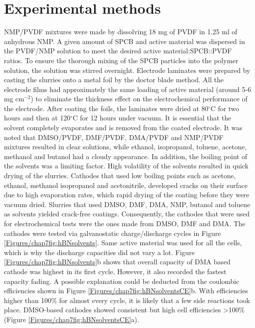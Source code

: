 \section{Experimental methods}
NMP/PVDF mixtures were made by dissolving 18 mg of PVDF in 1.25 ml of anhydrous NMP. A given amount of SPCB and active material was dispersed in the PVDF/NMP solution to meet the desired active material:SPCB::PVDF ratios. To ensure the thorough mixing of the SPCB particles into the polymer solution, the solution was stirred overnight. Electrode laminates were prepared by casting the slurries onto a metal foil by the doctor blade method. All the electrode films had approximately the same loading of active material (around 5-6 mg cm$^{-2}$) to eliminate the thickness effect on the electrochemical performance of the electrode. After coating the foils, the laminates were dried at 80$^{\circ}$C for two hours and then at 120$^{\circ}$C for 12 hours under vacuum. It is essential that the solvent completely evaporates and is removed from the coated electrode. It was noted that DMSO/PVDF, DMF/PVDF, DMA/PVDF and NMP/PVDF mixtures resulted in clear solutions, while ethanol, isopropanol, toluene, acetone, methanol and butanol had a cloudy appearance. 
In addition, the boiling point of the solvents was a limiting factor. High volatility of the solvents resulted in quick drying of the slurries. Cathodes that used low boiling points such as acetone, ethanol, methanol isopropanol and acetonitrile, developed cracks on their surface due to high evaporation rates, which rapid drying of the coating before they were vacuum dried.
Slurries that used DMSO, DMF, DMA, NMP, butanol and toluene as solvents yielded crack-free coatings. Consequently, the cathodes that were used for electrochemical tests were the ones made from DMSO, DMF and DMA.
The cathodes were tested via galvanostatic charge/discharge cycles in Figure \ref{Figures/chap7fig:hBNsolvents}. Same active material was used for all the cells, which is why the discharge capacities did not vary a lot. Figure \ref{Figures/chap7fig:hBNsolvents}b  shows that overall capacity of DMA based cathode was highest in its first cycle. However, it also recorded the fastest capacity fading. A possible explanation could be deducted from the coulombic efficiencies shown in Figure \ref{Figures/chap7fig:hBNsolventsCE}b. With efficiencies higher than 100\% for almost every cycle, it is likely that a few side reactions took place. DMSO-based cathodes showed consistent but high cell efficiencies >100\% (Figure \ref{Figures/chap7fig:hBNsolventsCE}a). 

